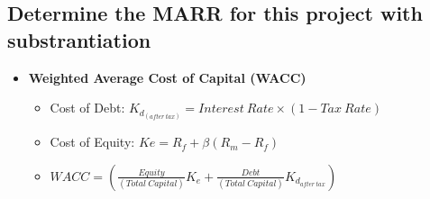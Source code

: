 \documentclass{article}
\title{}
\author{}
\begin{document}
\large
  \subsection{Determine the MARR for this project with substrantiation}
  \begin{itemize}
    \item \textbf{Weighted Average Cost of Capital (WACC)}
      \begin{itemize}
        \item Cost of Debt: $K_{d_{(after \ tax)}}=Interest \ Rate \times (1-Tax \ Rate)$ 
        \item Cost of Equity: $Ke=R_f + \beta (R_m-R_f)$ 
        \item $WACC=(\frac{Equity}{(Total \ Capital)}K_e+\frac{Debt}{(Total \
          Capital)}K_{d_{after \ tax}})$ 


\end{itemize}
\end{itemize}
\end{document}

